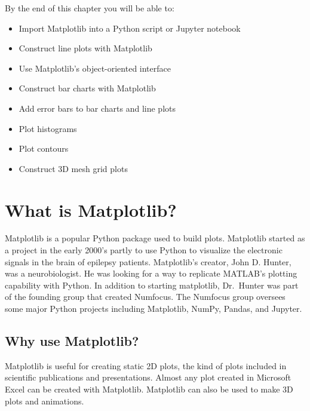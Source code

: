 \documentclass{book}
\begin{document}
    
        By the end of this chapter you will be able to:

\begin{itemize}
\item
  Import Matplotlib into a Python script or Jupyter notebook
\item
  Construct line plots with Matplotlib
\item
  Use Matplotlib's object-oriented interface
\item
  Construct bar charts with Matplotlib
\item
  Add error bars to bar charts and line plots
\item
  Plot histograms
\item
  Plot contours
\item
  Construct 3D mesh grid plots
\end{itemize}
        \newpage

    




    
        \hypertarget{what-is-matplotlib}{%
\section{What is Matplotlib?}\label{what-is-matplotlib}}
    




    
        Matplotlib is a popular Python package used to build plots. Matplotlib
started as a project in the early 2000's partly to use Python to
visualize the electronic signals in the brain of epilepsy patients.
Matplotlib's creator, John D. Hunter, was a neurobiologist. He was
looking for a way to replicate MATLAB's plotting capability with Python.
In addition to starting matplotlib, Dr.~Hunter was part of the founding
group that created Numfocus. The Numfocus group oversees some major
Python projects including Matplotlib, NumPy, Pandas, and Jupyter.
    




    
        \hypertarget{why-use-matplotlib}{%
\subsection{Why use Matplotlib?}\label{why-use-matplotlib}}
    




    
        Matplotlib is useful for creating static 2D plots, the kind of plots
included in scientific publications and presentations. Almost any plot
created in Microsoft Excel can be created with Matplotlib. Matplotlib
can also be used to make 3D plots and animations.
    
\end{document}
